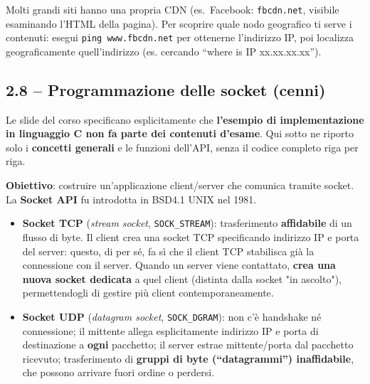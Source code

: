 \documentclass[12pt, a4paper]{article}
\begin{document}
\begin{tcolorbox}[colback=orange!5, colframe=orange!70!black, title=\textbf{Esercizio pratico 2.6 -- Trovare il nodo CDN che ti serve}]
Molti grandi siti hanno una propria CDN (es.\ Facebook: \texttt{fbcdn.net}, visibile esaminando l'HTML della pagina). Per scoprire quale nodo geografico ti serve i contenuti: esegui \texttt{ping www.fbcdn.net} per ottenerne l'indirizzo IP, poi localizza geograficamente quell'indirizzo (es. cercando ``where is IP xx.xx.xx.xx'').
\end{tcolorbox}

\subsection{2.8 -- Programmazione delle socket (cenni)}

\begin{tcolorbox}[colback=red!5, colframe=red!60!black, title=\textbf{\textcolor{red!60!black}{Attenzione}}]
Le slide del corso specificano esplicitamente che \textbf{l'esempio di implementazione in linguaggio C non fa parte dei contenuti d'esame}. Qui sotto ne riporto solo i \textbf{concetti generali} e le funzioni dell'API, senza il codice completo riga per riga.
\end{tcolorbox}

\textbf{Obiettivo}: costruire un'applicazione client/server che comunica tramite socket. La \textbf{Socket API} fu introdotta in BSD4.1 UNIX nel 1981.

\begin{itemize}
    \item \textbf{Socket TCP} (\textit{stream socket}, \texttt{SOCK\_STREAM}): trasferimento \textbf{affidabile} di un flusso di byte. Il client crea una socket TCP specificando indirizzo IP e porta del server: questo, di per sé, fa sì che il client TCP stabilisca già la connessione con il server. Quando un server viene contattato, \textbf{crea una nuova socket dedicata} a quel client (distinta dalla socket "in ascolto"), permettendogli di gestire più client contemporaneamente.
    \item \textbf{Socket UDP} (\textit{datagram socket}, \texttt{SOCK\_DGRAM}): non c'è handshake né connessione; il mittente allega esplicitamente indirizzo IP e porta di destinazione a \textbf{ogni} pacchetto; il server estrae mittente/porta dal pacchetto ricevuto; trasferimento di \textbf{gruppi di byte (``datagrammi'') inaffidabile}, che possono arrivare fuori ordine o perdersi.
\end{itemize}
\end{document}
